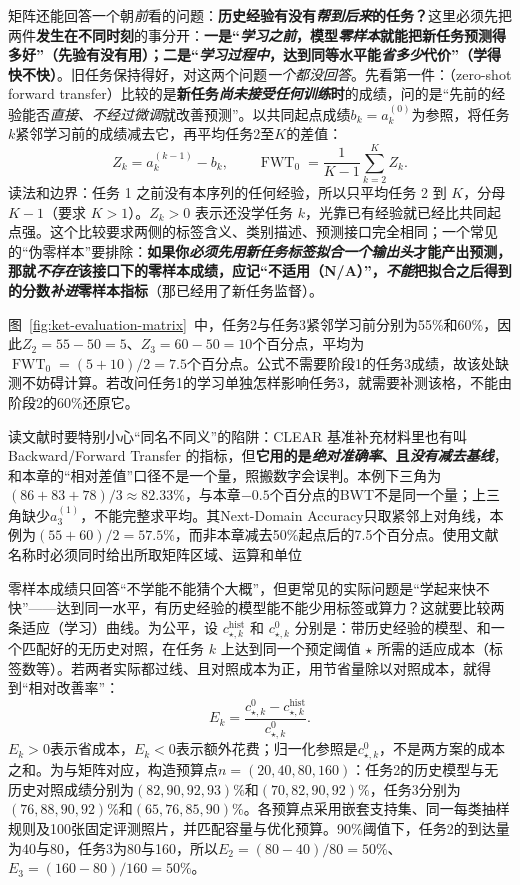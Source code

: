 矩阵还能回答一个朝\emph{前}看的问题：\textbf{历史经验有没有\emph{帮到\emph{后来}}的任务？}这里必须先把两件\textbf{发生在不同时刻}的事分开：\textbf{一是“\emph{学习之前}，模型\emph{零样本}就能把新任务预测得多好”（先验有没有用）；二是“\emph{学习过程中}，达到同等水平能\emph{省多少}代价”（学得快不快）}。旧任务保持得好，对这两个问题\emph{一个都没回答}。先看第一件：（zero-shot forward transfer）比较的是\textbf{新任务\emph{尚未接受任何训练}时}的成绩，问的是“先前的经验能否\emph{直接、不经过微调}就改善预测”。以共同起点成绩$b_k=a_k^{(0)}$为参照，将任务$k$紧邻学习前的成绩减去它，再平均任务2至$K$的差值：
\begin{equation}
  Z_k=a_k^{(k-1)}-b_k,\qquad
  \operatorname{FWT}_0
  =\frac1{K-1}\sum_{k=2}^{K}Z_k.
  \label{eq:ket-evaluation-zero-forward}
\end{equation}
读法和边界：任务 1 之前没有本序列的任何经验，所以只平均任务 2 到 $K$，分母 $K-1$（要求 $K>1$）。$Z_k>0$ 表示还没学任务 $k$，光靠已有经验就已经比共同起点强。这个比较要求两侧的标签含义、类别描述、预测接口完全相同；一个常见的“伪零样本”要排除：\textbf{如果你\emph{必须先用新任务标签拟合一个输出头}才能产出预测，那就\emph{不存在}该接口下的零样本成绩，应记“不适用（N/A）”，\emph{不能}把拟合之后得到的分数\emph{补进}零样本指标}（那已经用了新任务监督）。

图~\ref{fig:ket-evaluation-matrix}~中，任务2与任务3紧邻学习前分别为55\%和60\%，因此$Z_2=55-50=5$、$Z_3=60-50=10$个百分点，平均为$\operatorname{FWT}_0=(5+10)/2=7.5$个百分点。公式不需要阶段1的任务3成绩，故该处缺测不妨碍计算。若改问任务1的学习单独怎样影响任务3，就需要补测该格，不能由阶段2的60\%还原它。

读文献时要特别小心“同名不同义”的陷阱：CLEAR 基准补充材料里也有叫 Backward/Forward Transfer 的指标，但\textbf{它用的是\emph{绝对准确率}、且\emph{没有减去基线}}，和本章的“相对差值”口径不是一个量，照搬数字会误判。本例下三角为$(86+83+78)/3\approx82.33\%$，与本章$-0.5$个百分点的BWT不是同一个量；上三角缺少$a_3^{(1)}$，不能完整求平均。其Next-Domain Accuracy只取紧邻上对角线，本例为$(55+60)/2=57.5\%$，而非本章减去50\%起点后的7.5个百分点。使用文献名称时必须同时给出所取矩阵区域、运算和单位

零样本成绩只回答“不学能不能猜个大概”，但更常见的实际问题是“学起来快不快”——达到同一水平，有历史经验的模型能不能少用标签或算力？这就要比较两条适应（学习）曲线。为公平，设 $c_{\star,k}^{\mathrm{hist}}$ 和 $c_{\star,k}^{0}$ 分别是：带历史经验的模型、和一个匹配好的无历史对照，在任务 $k$ 上达到同一个预定阈值 $\star$ 所需的适应成本（标签数等）。若两者实际都过线、且对照成本为正，用节省量除以对照成本，就得到“相对改善率”：
\begin{equation}
  E_k=\frac{c_{\star,k}^{0}-c_{\star,k}^{\mathrm{hist}}}
             {c_{\star,k}^{0}}.
  \label{eq:ket-evaluation-learning-cost-gain}
\end{equation}
$E_k>0$表示省成本，$E_k<0$表示额外花费；归一化参照是$c_{\star,k}^{0}$，不是两方案的成本之和。为与矩阵对应，构造预算点$n=(20,40,80,160)$：任务2的历史模型与无历史对照成绩分别为$(82,90,92,93)\%$和$(70,82,90,92)\%$，任务3分别为$(76,88,90,92)\%$和$(65,76,85,90)\%$。各预算点采用嵌套支持集、同一每类抽样规则及100张固定评测照片，并匹配容量与优化预算。90\%阈值下，任务2的到达量为40与80，任务3为80与160，所以$E_2=(80-40)/80=50\%$、$E_3=(160-80)/160=50\%$。

